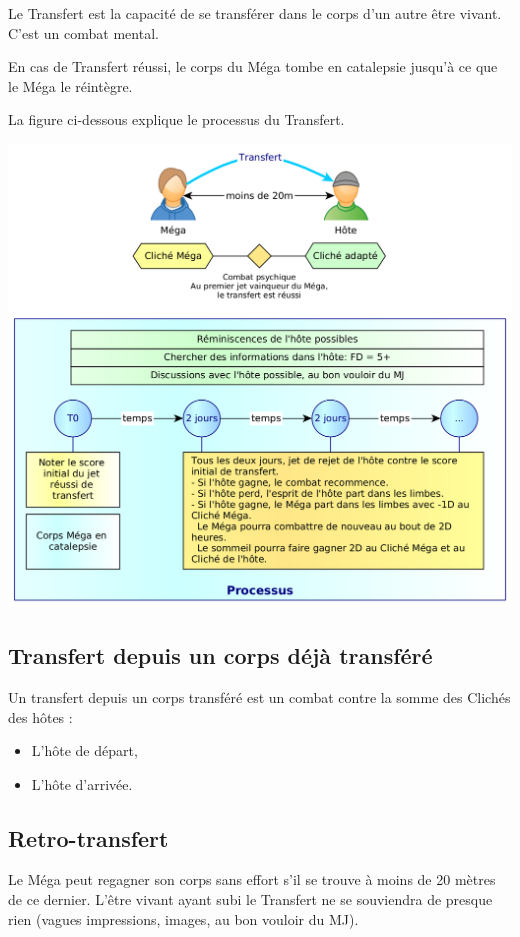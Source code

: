 \documentclass[11pt]{article}
\begin{document}
Le Transfert est la capacité de se transférer dans le corps d'un autre être vivant. C'est un combat mental.

En cas de Transfert réussi, le corps du Méga tombe en catalepsie jusqu'à ce que le Méga le réintègre.

La figure ci-dessous explique le processus du Transfert.

\begin{center}
\includegraphics[scale=.35]{06-transfert}
\end{center}

\subsection{Transfert depuis un corps déjà transféré}

Un transfert depuis un corps transféré est un combat contre la somme des Clichés des hôtes :
\begin{itemize}
\item L'hôte de départ,
\item L'hôte d'arrivée.
\end{itemize}

\subsection{Retro-transfert}

Le Méga peut regagner son corps sans effort s'il se trouve à moins de 20 mètres de ce dernier. L'être vivant ayant subi le Transfert ne se souviendra de presque rien (vagues impressions, images, au bon vouloir du MJ).
\end{document}
